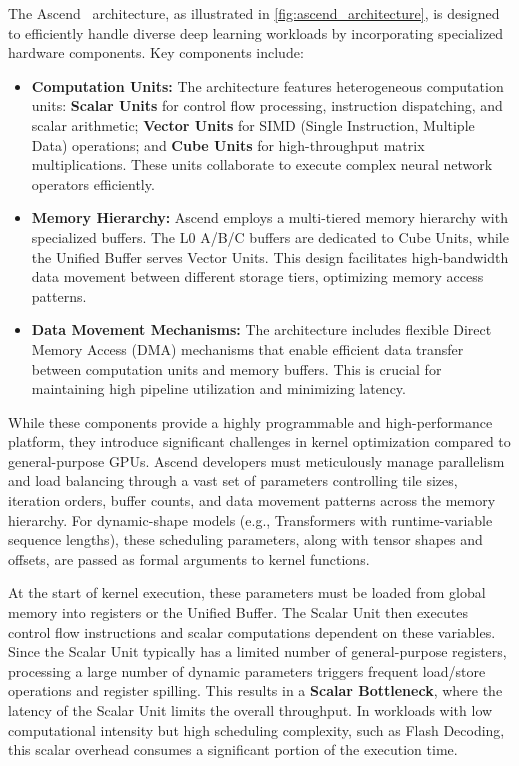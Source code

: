 The Ascend~\cite{liao2019davinci} architecture, as illustrated in \autoref{fig:ascend_architecture}, is designed to efficiently handle diverse deep learning workloads by incorporating specialized hardware components. Key components include:
\begin{itemize}
    \item \textbf{Computation Units:} The architecture features heterogeneous computation units: \textbf{Scalar Units} for control flow processing, instruction dispatching, and scalar arithmetic; \textbf{Vector Units} for SIMD (Single Instruction, Multiple Data) operations; and \textbf{Cube Units} for high-throughput matrix multiplications. These units collaborate to execute complex neural network operators efficiently.
    
    \item \textbf{Memory Hierarchy:} Ascend employs a multi-tiered memory hierarchy with specialized buffers. The L0 A/B/C buffers are dedicated to Cube Units, while the Unified Buffer serves Vector Units. This design facilitates high-bandwidth data movement between different storage tiers, optimizing memory access patterns.
    
    \item \textbf{Data Movement Mechanisms:} The architecture includes flexible Direct Memory Access (DMA) mechanisms that enable efficient data transfer between computation units and memory buffers. This is crucial for maintaining high pipeline utilization and minimizing latency.
\end{itemize}

While these components provide a highly programmable and high-performance platform, they introduce significant challenges in kernel optimization compared to general-purpose GPUs. 
Ascend developers must meticulously manage parallelism and load balancing through a vast set of parameters controlling tile sizes, iteration orders, buffer counts, and data movement patterns across the memory hierarchy. 
For dynamic-shape models (e.g., Transformers with runtime-variable sequence lengths), these scheduling parameters, along with tensor shapes and offsets, are passed as formal arguments to kernel functions. 

At the start of kernel execution, these parameters must be loaded from global memory into registers or the Unified Buffer. The Scalar Unit then executes control flow instructions and scalar computations dependent on these variables. 
Since the Scalar Unit typically has a limited number of general-purpose registers, processing a large number of dynamic parameters triggers frequent load/store operations and register spilling. 
This results in a \textbf{Scalar Bottleneck}, where the latency of the Scalar Unit limits the overall throughput. 
In workloads with low computational intensity but high scheduling complexity, such as Flash Decoding, this scalar overhead consumes a significant portion of the execution time.

